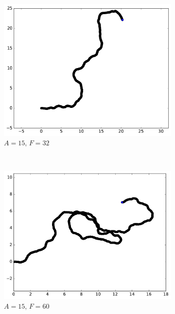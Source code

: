 \begin{figure}[htb]
\begin{subfigure}[t]{\subImgWmo}
			\centering
			\includegraphics[width=\textwidth]{figures/ch3/synTraj_219_15_32}
			\caption[$A = 15$, $F=32$]{$A = 15$, $F=32$}
			\label{fig:synTraj_219_15_32}
		\end{subfigure}
		~
		\begin{subfigure}[t]{\subImgWmo}
			\centering
			\includegraphics[width=\textwidth]{figures/ch3/synTraj_219_15_60}
			\caption[$A = 15$, $F=60$]{$A = 15$, $F=60$}
			\label{fig:synTraj_219_15_60}
		\end{subfigure}
		~
		\begin{subfigure}[t]{\subImgWmo}
			\centering

\end{subfigure}
\end{figure}
